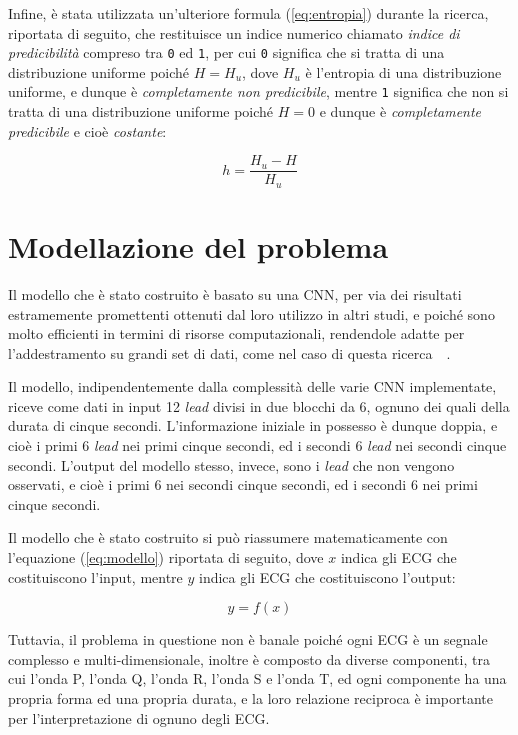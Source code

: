 \documentclass[12pt,italian]{report}
\begin{document}
Infine, è stata utilizzata un'ulteriore formula (\ref{eq:entropia}) durante la ricerca, riportata di seguito, che restituisce un indice numerico chiamato \textit{indice di predicibilità} compreso tra \texttt{0} ed \texttt{1}, per cui \texttt{0} significa che si tratta di una distribuzione uniforme poiché $ H = H_{u} $, dove $ H_{u} $ è l'entropia di una distribuzione uniforme, e dunque è \textit{completamente non predicibile}, mentre \texttt{1} significa che non si tratta di una distribuzione uniforme poiché $ H = 0 $ e dunque è \textit{completamente predicibile} e cioè \textit{costante}:

\begin{equation}
    h = \frac{H_{u} - H}{H_{u}}
    \label{eq:entropia}
\end{equation}

\section{Modellazione del problema}
\label{sec:modellazione}

Il modello che è stato costruito è basato su una CNN, per via dei risultati estramemente promettenti ottenuti dal loro utilizzo in altri studi, e poiché sono molto efficienti in termini di risorse computazionali, rendendole adatte per l'addestramento su grandi set di dati, come nel caso di questa ricerca~\cite{ribeiro}~\cite{hannun}.

Il modello, indipendentemente dalla complessità delle varie CNN implementate, riceve come dati in input 12 \textit{lead} divisi in due blocchi da 6, ognuno dei quali della durata di cinque secondi. L'informazione iniziale in possesso è dunque doppia, e cioè i primi 6 \textit{lead} nei primi cinque secondi, ed i secondi 6 \textit{lead} nei secondi cinque secondi. L'output del modello stesso, invece, sono i \textit{lead} che non vengono osservati, e cioè i primi 6 nei secondi cinque secondi, ed i secondi 6 nei primi cinque secondi.

Il modello che è stato costruito si può riassumere matematicamente con l'equazione (\ref{eq:modello}) riportata di seguito, dove $ x $ indica gli ECG che costituiscono l'input, mentre $ y $ indica gli ECG che costituiscono l'output:

\begin{equation}
    y = f(x)
    \label{eq:modello}
\end{equation}

Tuttavia, il problema in questione non è banale poiché ogni ECG è un segnale complesso e multi-dimensionale, inoltre è composto da diverse componenti, tra cui l'onda P, l'onda Q, l'onda R, l'onda S e l'onda T, ed ogni componente ha una propria forma ed una propria durata, e la loro relazione reciproca è importante per l'interpretazione di ognuno degli ECG.
\end{document}
